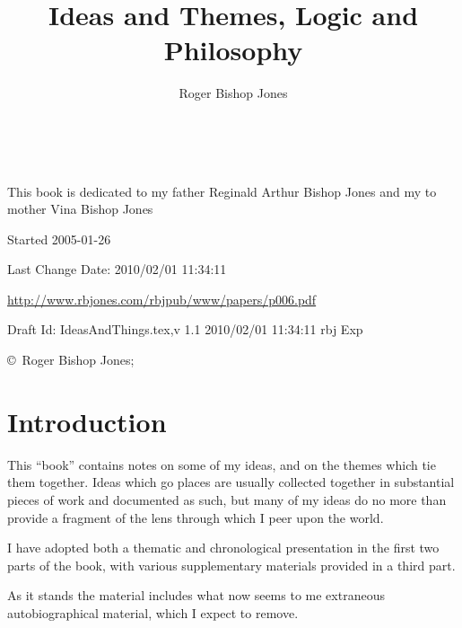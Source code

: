 \documentclass[10pt,titlepage]{book}
\title{Ideas and Themes, Logic and Philosophy}
\author{Roger Bishop Jones}
\date{\ }
\begin{document}
\frontmatter

\begin{titlepage}
\maketitle

\vfill


\begin{centering}

{\parskip=0.3in
This book is dedicated to my father
\vfil
{ Reginald Arthur Bishop Jones}
\vfil
and my to mother
\vfil
{ Vina Bishop Jones}
}

\vfill

\footnotesize{
Started 2005-01-26

Last Change $ $Date: 2010/02/01 11:34:11 $ $

\href{http://www.rbjones.com/rbjpub/www/papers/p006.pdf}{http://www.rbjones.com/rbjpub/www/papers/p006.pdf}

Draft $ $Id: IdeasAndThings.tex,v 1.1 2010/02/01 11:34:11 rbj Exp $ $

\copyright\ Roger Bishop Jones;

}%
\end{centering}

\thispagestyle{empty}
\end{titlepage}

{\parskip=0pt\tableofcontents}


\mainmatter
\chapter{Introduction}

This ``book'' contains notes on some of my ideas, and on the themes which tie them together.
Ideas which go places are usually collected together in substantial pieces of work and documented as such, but many of my ideas do no more than provide a fragment of the lens through which I peer upon the world.

I have adopted both a thematic and chronological presentation in the first two parts of the book, with various supplementary materials provided in a third part.

As it stands the material includes what now seems to me extraneous autobiographical material, which I expect to remove.
\end{document}
